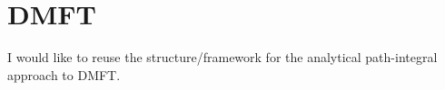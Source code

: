 
\section{DMFT}
I would like to reuse the structure/framework for the analytical path-integral approach to DMFT. \cite{metz_dynamical_2025}
